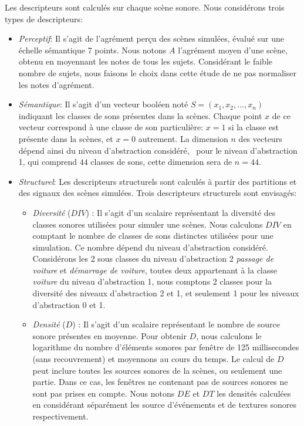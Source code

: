 Les descripteurs sont calculés sur chaque scène sonore. Nous considérons trois types de descripteurs:

\begin{itemize}
\item \emph{Perceptif}: Il s'agit de l'agrément perçu des scènes simulées, évalué sur une échelle sémantique 7 points. Nous notons $A$ l'agrément moyen d'une scène, obtenu en moyennant les notes de tous les sujets. Considérant le faible nombre de sujets, nous faisons le choix dans cette étude de ne pas normaliser les notes d'agrément.
\item \emph{Sémantique}: Il s'agit d'un vecteur booléen noté $S=(x_1,x_2,\ldots,x_n)$ indiquant les classes de sons présentes dans la scènes. Chaque point $x$ de ce vecteur correspond à une classe de son particulière: $x=1$ si la classe est présente dans la scènes, et $x=0$ autrement. La dimension $n$ des vecteurs dépend ainsi du niveau d'abstraction considéré, \eg~pour le niveau d'abstraction 1, qui comprend $44$ classes de sons, cette dimension sera de $n=44$.
\item \emph{Structurel}: Les descripteurs structurels sont calculés à partir des partitions et des signaux des scènes simulées. Trois descripteurs structurels sont envisagés:
\begin{itemize}
\item \emph{Diversité} ($DIV$) : Il s'agit d'un scalaire représentant la diversité des classes sonores utilisées pour simuler une scènes. Nous calculons $DIV$ en comptant le nombre de classes de sons distinctes utilisées pour une simulation. Ce nombre dépend du niveau d'abstraction considéré. Considérons les 2 sous classes du niveau d'abstraction 2 \emph{passage de voiture} et \emph{démarrage de voiture}, toutes deux appartenant à la classe \emph{voiture} du niveau d'abstraction 1, nous comptons 2 classes pour la diversité des niveaux d'abstraction 2 et 1, et seulement 1 pour les niveaux d'abstraction 0 et 1.
\item \emph{Densité} ($D$) : Il s'agit d'un scalaire représentant le nombre de source sonore présentes en moyenne. Pour obtenir $D$, nous calculons le logarithme du nombre d'éléments sonores par fenêtre de 125 millisecondes (sans recouvrement) et moyennons au cours du temps. Le calcul de $D$ peut inclure toutes les sources sonores de la scènes, ou seulement une partie. Dans ce cas, les fenêtres ne contenant pas de sources sonores ne sont pas prises en compte. Nous notons $DE$ et $DT$ les densités calculées en considérant séparément les source d'événements et de textures sonores respectivement.

\end{itemize}
\end{itemize}
